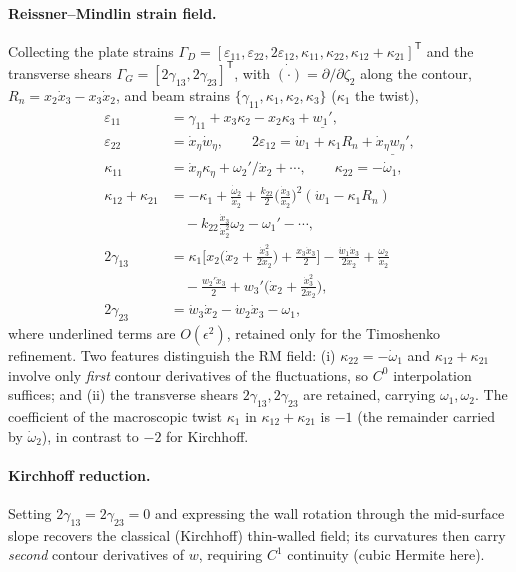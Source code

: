 \documentclass[preprint,12pt]{elsarticle}
\newcommand{\T}{^{\mathsf{T}}}
\newcommand{\eps}{\varepsilon}
\begin{document}
\paragraph{Reissner--Mindlin strain field.} Collecting the plate strains
$\Gamma_D=[\eps_{11},\eps_{22},2\eps_{12},\kappa_{11},\kappa_{22},
\kappa_{12}{+}\kappa_{21}]\T$ and the transverse shears
$\Gamma_G=[2\gamma_{13},2\gamma_{23}]\T$, with $\dot{(\cdot)}=\partial/\partial
\zeta_2$ along the contour, $R_n=x_2\dot{x}_3-x_3\dot{x}_2$, and beam strains
$\{\gamma_{11},\kappa_1,\kappa_2,\kappa_3\}$ ($\kappa_1$ the twist),
\begin{align}
\eps_{11}&=\gamma_{11}+x_3\kappa_2-x_2\kappa_3+\underline{w_1'},\\
\eps_{22}&=\dot{x}_\eta\dot{w}_\eta,\qquad
2\eps_{12}=\dot{w}_1+\kappa_1 R_n+\underline{\dot{x}_\eta w_\eta'},\\
\kappa_{11}&=\dot{x}_\eta\kappa_\eta+\omega_2'/\dot{x}_2+\cdots,\qquad
\kappa_{22}=-\dot{\omega}_1,\\
\kappa_{12}{+}\kappa_{21}&=-\kappa_1+\frac{\dot{\omega}_2}{\dot{x}_2}
+\frac{k_{22}}{2}\Big(\frac{\dot{x}_3}{\dot{x}_2}\Big)^{\!2}(\dot{w}_1-\kappa_1 R_n)
\nonumber\\ &\quad
-k_{22}\frac{\dot{x}_3}{\dot{x}_2^{2}}\omega_2-\omega_1'-\cdots,\\
2\gamma_{13}&=\kappa_1\Big[x_2\Big(\dot{x}_2+\frac{\dot{x}_3^{2}}{2\dot{x}_2}\Big)
+\frac{x_3\dot{x}_3}{2}\Big]-\frac{\dot{w}_1\dot{x}_3}{2\dot{x}_2}
+\frac{\omega_2}{\dot{x}_2}
\nonumber\\ &\quad
-\frac{w_2'\dot{x}_3}{2}+w_3'\Big(\dot{x}_2+\frac{\dot{x}_3^{2}}{2\dot{x}_2}\Big),\\
2\gamma_{23}&=\dot{w}_3\dot{x}_2-\dot{w}_2\dot{x}_3-\omega_1,
\label{eq:rmstrain}
\end{align}
where underlined terms are $O(\epsilon^2)$, retained only for the Timoshenko
refinement. Two features distinguish the RM field: (i) $\kappa_{22}=-\dot
\omega_1$ and $\kappa_{12}{+}\kappa_{21}$ involve only \emph{first} contour
derivatives of the fluctuations, so $C^0$ interpolation suffices; and (ii) the
transverse shears $2\gamma_{13},2\gamma_{23}$ are retained, carrying
$\omega_1,\omega_2$. The coefficient of the macroscopic twist $\kappa_1$ in
$\kappa_{12}{+}\kappa_{21}$ is $-1$ (the remainder carried by $\dot\omega_2$),
in contrast to $-2$ for Kirchhoff.

\paragraph{Kirchhoff reduction.} Setting $2\gamma_{13}=2\gamma_{23}=0$ and
expressing the wall rotation through the mid-surface slope recovers the
classical (Kirchhoff) thin-walled field; its curvatures then carry \emph{second}
contour derivatives of $w$, requiring $C^1$ continuity (cubic Hermite here).
\end{document}
